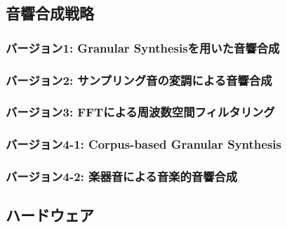 \subsection{音響合成戦略}

\subsubsection{バージョン1: Granular Synthesisを用いた音響合成}

\subsubsection{バージョン2: サンプリング音の変調による音響合成}

\subsubsection{バージョン3: FFTによる周波数空間フィルタリング}

\subsubsection{バージョン4-1: Corpus-based Granular Synthesis}

\subsubsection{バージョン4-2: 楽器音による音楽的音響合成}

\subsection{ハードウェア}

